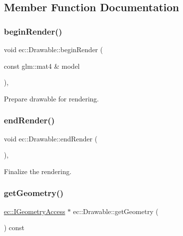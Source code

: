 \subsection{Member Function Documentation}
\mbox{\label{classec_1_1_drawable_a9cb72c1eda19a82c849a291e7d45f2b8}} 
\subsubsection{\texorpdfstring{begin\+Render()}{beginRender()}}
{\footnotesize\ttfamily void ec\+::\+Drawable\+::begin\+Render (\begin{DoxyParamCaption}\item[{const glm\+::mat4 \&}]{model }\end{DoxyParamCaption})\hspace{0.3cm}{\ttfamily [protected]}, {\ttfamily [virtual]}}

Prepare drawable for rendering. \mbox{\label{classec_1_1_drawable_abf99119cd72054a55d91a7605aa62e32}} 
\subsubsection{\texorpdfstring{end\+Render()}{endRender()}}
{\footnotesize\ttfamily void ec\+::\+Drawable\+::end\+Render (\begin{DoxyParamCaption}{ }\end{DoxyParamCaption})\hspace{0.3cm}{\ttfamily [protected]}, {\ttfamily [virtual]}}

Finalize the rendering. \mbox{\label{classec_1_1_drawable_a49a90aac40736ff3c182196c2b86c2f3}} 
\subsubsection{\texorpdfstring{get\+Geometry()}{getGeometry()}}
{\footnotesize\ttfamily \mbox{\hyperlink{classec_1_1_i_geometry_access}{ec\+::\+I\+Geometry\+Access}} $\ast$ ec\+::\+Drawable\+::get\+Geometry (\begin{DoxyParamCaption}{ }\end{DoxyParamCaption}) const}

